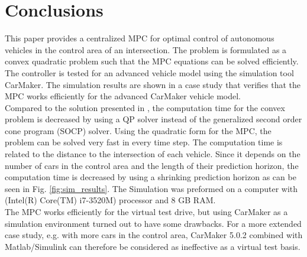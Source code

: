 \documentclass[letterpaper,10pt,conference]{ieeeconf}
\begin{document}
\section{Conclusions} \label{sec:conclusions}
This paper provides a centralized MPC for optimal control of autonomous vehicles in the control area of an intersection. The problem is formulated as a convex quadratic problem such that the MPC equations can be solved efficiently. The controller is tested for an advanced vehicle model using the simulation tool CarMaker. The simulation results are shown in a case study that verifies that the MPC works efficiently for the advanced CarMaker vehicle model.\\ \indent
Compared to the solution presented in \cite{nikolce}, the computation time for the convex problem is decreased by using a QP solver instead of the generalized second order cone program (SOCP) solver. Using the quadratic form for the MPC, the problem can be solved very fast in every time step. The computation time is related to the distance to the intersection of each vehicle. Since it depends on the number of cars in the control area and the length of their prediction horizon, the computation time is decreased by using a shrinking prediction horizon as can be seen in Fig. \ref{fig:sim_results}. The Simulation was preformed on a computer with (Intel(R) Core(TM) i7-3520M) processor and 8 GB RAM.\\ \indent
The MPC works efficiently for the virtual test drive, but using CarMaker as a simulation environment turned out to have some drawbacks.
For a more extended case study, e.g. with more cars in the control area, CarMaker 5.0.2 combined with Matlab/Simulink can therefore be considered as ineffective as a virtual test basis.%
\end{document}
